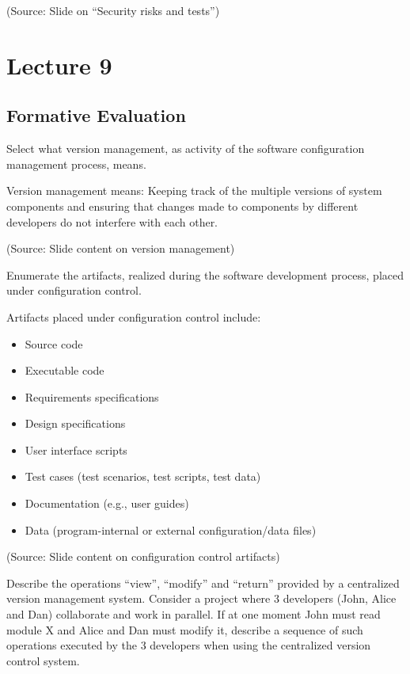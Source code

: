\documentclass[12pt]{article}
\begin{document}
(Source: Slide on ``Security risks and tests'')

\newpage
\section{Lecture 9}

\subsection{Formative Evaluation}

\begin{questionbox}
Select what version management, as activity of the software configuration management process, means.
\end{questionbox}

Version management means: Keeping track of the multiple versions of system components and ensuring that changes made to components by different developers do not interfere with each other.

(Source: Slide content on version management)

\begin{questionbox}
Enumerate the artifacts, realized during the software development process, placed under configuration control.
\end{questionbox}

Artifacts placed under configuration control include:
\begin{itemize}
    \item Source code
    \item Executable code
    \item Requirements specifications
    \item Design specifications
    \item User interface scripts
    \item Test cases (test scenarios, test scripts, test data)
    \item Documentation (e.g., user guides)
    \item Data (program-internal or external configuration/data files)
\end{itemize}

(Source: Slide content on configuration control artifacts)

\begin{questionbox}
Describe the operations ``view'', ``modify'' and ``return'' provided by a centralized version management system. Consider a project where 3 developers (John, Alice and Dan) collaborate and work in parallel. If at one moment John must read module X and Alice and Dan must modify it, describe a sequence of such operations executed by the 3 developers when using the centralized version control system.
\end{questionbox}
\end{document}
